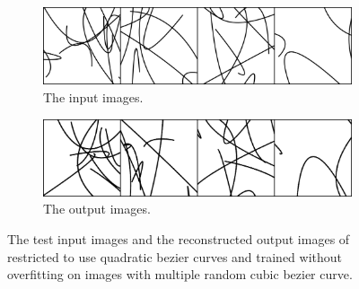 \begin{figure}
    \centering
    \begin{subfigure}{.45\textwidth}
        \includegraphics[width=\textwidth]{graphics/work-artifacts/im2vec/587/real_img_VectorVAEnLayers_1545.png}
        \caption{The input images.}
    \end{subfigure}
    \begin{subfigure}{.45\textwidth}
        \includegraphics[width=\textwidth]{graphics/work-artifacts/im2vec/587/recons_VectorVAEnLayers_1545.png}
        \caption{The output images.}
    \end{subfigure}
    \caption{The test input images and the reconstructed output images of \citep{DBLP:conf/cvpr/Reddy21} restricted to use quadratic bezier curves and trained without overfitting on images with multiple random cubic bezier curve.}
    \label{fig:587.recons}
\end{figure}

